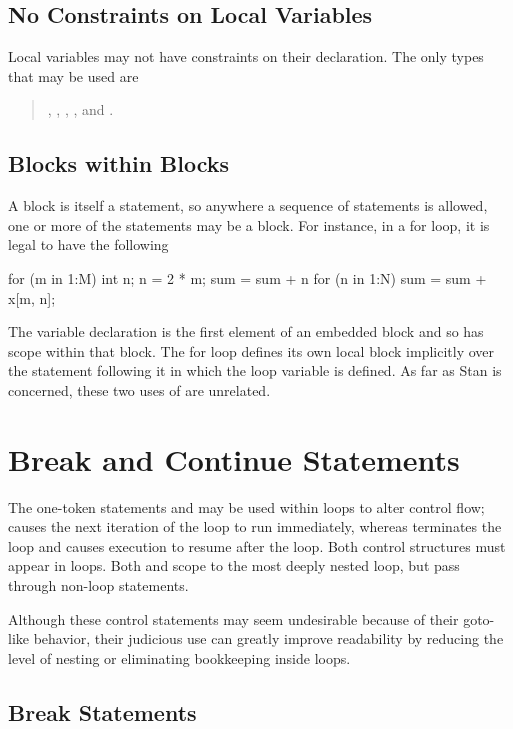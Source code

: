 \subsection{No Constraints on Local Variables}

Local variables may not have constraints on their declaration.  The
only types that may be used are
%
\begin{quote}
, ,
, , and .
\end{quote}

\subsection{Blocks within Blocks}

A block is itself a statement, so anywhere a sequence of statements is
allowed, one or more of the statements may be a block.  For instance,
in a for loop, it is legal to have the following
%
\begin{stancode}
for (m in 1:M) {
  {
     int n;
     n = 2 * m;
     sum = sum + n
  }
  for (n in 1:N)
    sum = sum + x[m, n];
}
\end{stancode}
%
The variable declaration  is the first element of an
embedded block and so has scope within that block.  The for loop
defines its own local block implicitly over the statement following it
in which the loop variable is defined.  As far as Stan is concerned,
these two uses of  are unrelated.

\section{Break and Continue Statements}

The one-token statements  and  may be used
within loops to alter control flow;   causes the next
iteration of the loop to run immediately, whereas 
terminates the loop and causes execution to resume after the loop.
Both control structures must appear in loops.  Both  and
 scope to the most deeply nested loop, but pass through
non-loop statements.

Although these control statements may seem undesirable because of
their goto-like behavior, their judicious use can greatly improve
readability by reducing the level of nesting or eliminating bookkeeping
inside loops.

\subsection{Break Statements}

